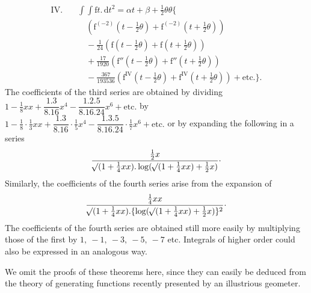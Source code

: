 \[
\begin{aligned}
\mathrm{IV.}\quad&\int\!\int\mathrm{f}t.\,\mathrm{d}t^2=\alpha t+\beta+\tfrac12\theta\theta\bigl\{\\
&\quad(\mathrm{f}^{(-2)}(t-\tfrac12\theta)+\mathrm{f}^{(-2)}(t+\tfrac12\theta))\\
&\quad-\tfrac1{24}(\mathrm{f}(t-\tfrac12\theta)+\mathrm{f}(t+\tfrac12\theta))\\
&\quad+\tfrac{17}{1920}(\mathrm{f}''(t-\tfrac12\theta)+\mathrm{f}''(t+\tfrac12\theta))\\
&\quad-\tfrac{367}{193536}(\mathrm{f}^{\mathrm{IV}}(t-\tfrac12\theta)+\mathrm{f}^{\mathrm{IV}}(t+\tfrac12\theta))+\text{etc.}\bigr\}.
\end{aligned}
\]
The coefficients of the third series are obtained by dividing \(1-\tfrac18xx+\dfrac{1.3}{8.16}x^4-\dfrac{1.2.5}{8.16.24}x^6+\text{etc.}\) by \(1-\tfrac18\cdot\tfrac13xx+\dfrac{1.3}{8.16}\cdot\tfrac15x^4-\dfrac{1.3.5}{8.16.24}\cdot\tfrac17x^6+\text{etc.}\) or by expanding the following in a series
\[
\dfrac{\tfrac12x}{\mathord{{}^{}\!\surd}(1+\tfrac14xx).\log(\mathord{{}^{}\!\surd}(1+\tfrac14xx)+\tfrac12x)}\mathpunct{\cdot}
\]
Similarly, the coefficients of the fourth series arise from the expansion of
\[
\dfrac{\tfrac14xx}{\mathord{{}^{}\!\surd}(1+\tfrac14xx).\{\log(\mathord{{}^{}\!\surd}(1+\tfrac14xx)+\tfrac12x)\}^2}\mathpunct{\cdot}
\]
The coefficients of the fourth series are obtained still more easily by multiplying those of the first by \(1,\ -1,\ -3,\ -5,\ -7\) etc. Integrals of higher order could also be expressed in an analogous way.
\par We omit the proofs of these theorems here, since they can easily be deduced from the theory of generating functions recently presented by an illustrious geometer.
\par\endgroup
